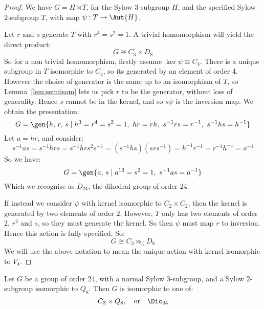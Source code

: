 \begin{proof}
    We have \(G = H \rtimes T\), for the Sylow 3-subgroup \(H\), and the specified Sylow 2-subgroup \(T\), with map
    \(\psi:T \to \Aut{H}\).

    Let \(r\) and \(s\) generate \(T\) with \(r^4 = s^2 = 1\).
    A trivial homomorphism will yield the direct product:
    \[G \cong C_3 \times D_8\]
    So for a non trivial homomorphism, firstly assume \(\ker\psi \cong C_4\).
    There is a unique subgroup in \(T\) isomorphic to \(C_4\), so its generated by an element of order 4.
    However the choice of generator is the same up to an isomorphism of \(T\), so Lemma~\ref{lem:semiisom} lets us
    pick \(r\) to be the generator, without loss of generality.
    Hence \(s\) cannot be in the kernel, and so \(s\psi\) is the inversion map.
    We obtain the presentation:
    \[G = \gen{h,\,r,\,s \mid h^3 = r^4 = s^2 = 1,\ hr = rh,\ s^{-1}rs = r^{-1},\ s^{-1}hs = h^{-1}}\]
    Let \(a = hr\), and consider:
    \[s^{-1}as = s^{-1}hrs = s^{-1}hrs^2 s^{-1} = (s^{-1}hs)(srs^{-1}) = h^{-1}r^{-1} = r^{-1}h^{-1} = a^{-1}\]
    So we have:
    \[G = \gen{a,\,s \mid a^{12} = s^2 = 1,\ s^{-1}as = a^{-1}}\]
    Which we recognise as \(D_{24}\), the dihedral group of order 24.

    If instead we consider \(\psi\) with kernel isomorphic to \(C_2 \times C_2\), then the kernel is generated by
    two elements of order 2.
    However, \(T\) only has two elements of order 2, \(r^2\) and \(s\), so they must generate the kernel.
    So then \(\psi\) must map \(r\) to inversion.
    Hence this action is fully specified.
    So:
    \[G \cong C_3 \rtimes_{V_4} D_8\]
    We will use the above notation to mean the unique action with kernel isomorphic to \(V_4\).
\end{proof}

\begin{lemma}
    Let \(G\) be a group of order 24, with a normal Sylow 3-subgroup, and a Sylow 2-subgroup isomorphic to \(Q_8\).
    Then \(G\) is isomorphic to one of:
    \[
        C_3 \times Q_8, \quad \text{or} \quad%
        \Dic_{24}
    \]
\end{lemma}

